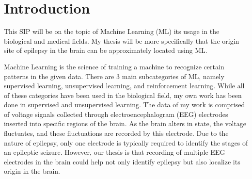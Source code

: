 \section{Introduction}
This SIP will be on the topic of Machine Learning (ML) its usage in the biological and medical fields. My thesis will be more specifically that the origin site of epilepsy in the brain can be approximately located using ML.



Machine Learning is the science of training a machine to recognize certain patterns in the given data. There are 3 main subcategories of ML, namely supervised learning, unsupervised learning, and reinforcement learning. While all of these categories have been used in the biological field, my own work has been done in supervised and unsupervised learning. The data of my work is comprised of voltage signals collected through electroencephalogram (EEG) electrodes inserted into specific regions of the brain. As the brain alters in state, the voltage fluctuates, and these fluctuations are recorded by this electrode. Due to the nature of epilepsy, only one electrode is typically required to identify the stages of an epileptic seizure. However, our thesis is that recording of multiple EEG electrodes in the brain could help not only identify epilepsy but also localize its origin in the brain.


